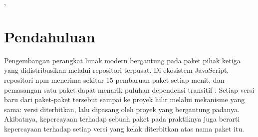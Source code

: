 \documentclass[a4paper,fleqn]{cas-dc}
\begin{document}
\let\WriteBookmarks\relax
\def\floatpagepagefraction{1}
\def\textpagefraction{.001}

\shorttitle{}
\shortauthors{}

\title[mode=title]{}

\author[1]{}
\cormark[1]
\credit{}



\begin{abstract}[]
\end{abstract}

\begin{highlights}
\item
\item
\item
\end{highlights}

\begin{keywords}
\sep
\end{keywords}

\maketitle

\section{Pendahuluan}\label{sec:intro}


Pengembangan perangkat lunak modern bergantung pada paket pihak ketiga yang
didistribusikan melalui repositori terpusat. Di ekosistem JavaScript, repositori
npm menerima sekitar 15 pembaruan paket setiap menit, dan pemasangan satu paket
dapat menarik puluhan dependensi transitif \citep{wyss2025evaluating}. Setiap
versi baru dari paket-paket tersebut sampai ke proyek hilir melalui mekanisme
yang sama: versi diterbitkan, lalu dipasang oleh proyek yang bergantung padanya.
Akibatnya, kepercayaan terhadap sebuah paket pada praktiknya juga berarti
kepercayaan terhadap setiap versi yang kelak diterbitkan atas nama paket itu.
\end{document}
